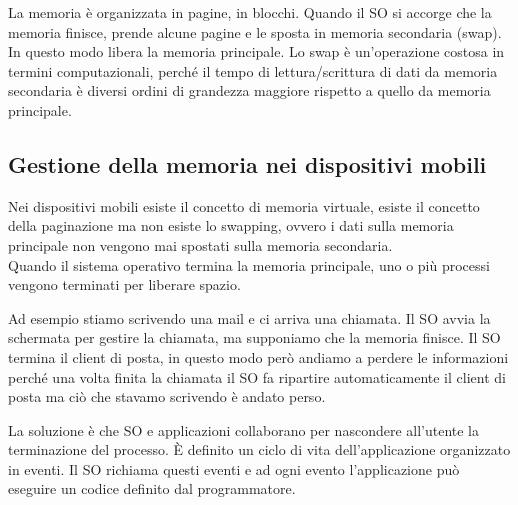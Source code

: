 La memoria è organizzata in pagine, in blocchi. Quando il SO si accorge che la memoria finisce, prende alcune pagine e le sposta in memoria secondaria (swap). In questo modo libera la memoria principale. Lo swap è un'operazione costosa in termini computazionali, perché il tempo di lettura/scrittura di dati da memoria secondaria è diversi ordini di grandezza maggiore rispetto a quello da memoria principale.

\subsection{Gestione della memoria nei dispositivi mobili}
Nei dispositivi mobili esiste il concetto di memoria virtuale, esiste il concetto della paginazione ma non esiste lo swapping, ovvero i dati sulla memoria principale non vengono mai spostati sulla memoria secondaria. 
\\ Quando il sistema operativo termina la memoria principale, uno o più processi vengono terminati per liberare spazio. 

Ad esempio stiamo scrivendo una mail e ci arriva una chiamata. Il SO avvia la schermata per gestire la chiamata, ma supponiamo che la memoria finisce. Il SO termina il client di posta, in questo modo però andiamo a perdere le informazioni perché una volta finita la chiamata il SO fa ripartire automaticamente il client di posta ma ciò che stavamo scrivendo è andato perso. 

La soluzione è che SO e applicazioni collaborano per nascondere all'utente la terminazione del processo. È definito un ciclo di vita dell'applicazione organizzato in eventi. Il SO richiama questi eventi e ad ogni evento l'applicazione può eseguire un codice definito dal programmatore.

